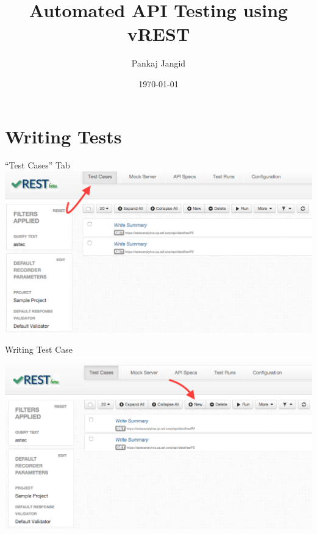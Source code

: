 \documentclass{beamer}
\title[Automated API Testing using vREST]{Automated API Testing using vREST}
\author{Pankaj Jangid}
\institute{Optimizory Technologies Pvt. Ltd.}
\date{\today}
\begin{document}
\begin{frame}
\titlepage
\end{frame}


\section{Writing Tests}
\begin{frame}{``Test Cases'' Tab}
    \includegraphics[scale=0.30]{images/test_cases_tab.PNG}
\end{frame}
\begin{frame}{Writing Test Case}
    \includegraphics[scale=0.30]{images/new_test_case_button.PNG}
\end{frame}
\end{document}
